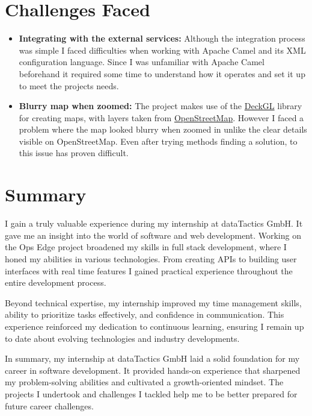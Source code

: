 %
%

\section{Challenges Faced}
\label{sec:conclusion:challenges_faced}

\begin{itemize}
    \item \textbf{Integrating with the external services:} Although the integration process was simple I faced difficulties when working with Apache Camel and its XML configuration language. Since I was unfamiliar with Apache Camel beforehand it required some time to understand how it operates and set it up to meet the projects needs.
    \item \textbf{Blurry map when zoomed:} The project makes use of the \href{https://deck.gl/}{DeckGL} library for creating maps, with layers taken from \href{https://www.openstreetmap.org/}{OpenStreetMap}. However I faced a problem where the map looked blurry when zoomed in unlike the clear details visible on OpenStreetMap. Even after trying methods finding a solution, to this issue has proven difficult.
\end{itemize}

\section{Summary}
\label{sec:conclusion:summary}

I gain a truly valuable experience during my internship at dataTactics GmbH. It gave me an insight into the world of software and web development. Working on the Ops Edge project broadened my skills in full stack development, where I honed my abilities in various technologies. From creating APIs to building user interfaces with real time features I gained practical experience throughout the entire development process.

Beyond technical expertise, my internship improved my time management skills, ability to prioritize tasks effectively, and confidence in communication. This experience reinforced my dedication to continuous learning, ensuring I remain up to date about evolving technologies and industry developments.

In summary, my internship at dataTactics GmbH laid a solid foundation for my career in software development. It provided hands-on experience that sharpened my problem-solving abilities and cultivated a growth-oriented mindset. The projects I undertook and challenges I tackled help me to be better prepared for future career challenges.